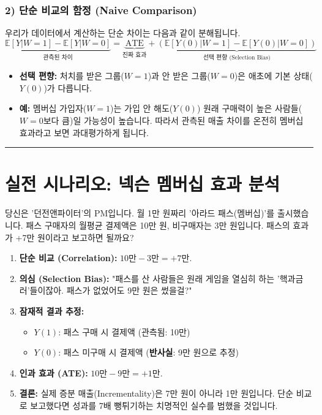 \documentclass[11pt,a4paper]{book}
\theoremstyle{definition}
\begin{document}
\subsubsection*{2) 단순 비교의 함정 (Naive Comparison)}
우리가 데이터에서 계산하는 단순 차이는 다음과 같이 분해됩니다.
$$ \underbrace{\mathbb{E}[Y|W=1] - \mathbb{E}[Y|W=0]}_{\text{관측된 차이}} = \underbrace{\text{ATE}}_{\text{진짜 효과}} + \underbrace{(\mathbb{E}[Y(0)|W=1] - \mathbb{E}[Y(0)|W=0])}_{\text{선택 편향 (Selection Bias)}} $$
\begin{itemize}
    \item \textbf{선택 편향:} 처치를 받은 그룹($W=1$)과 안 받은 그룹($W=0$)은 애초에 기본 상태($Y(0)$)가 다릅니다.
    \item \textbf{예:} 멤버십 가입자($W=1$)는 가입 안 해도($Y(0)$) 원래 구매력이 높은 사람들($W=0$보다 큼)일 가능성이 높습니다. 따라서 관측된 매출 차이를 온전히 멤버십 효과라고 보면 과대평가하게 됩니다.
\end{itemize}

\vspace{0.5cm}\hrule\vspace{0.5cm}

\section{실전 시나리오: 넥슨 멤버십 효과 분석}

\begin{storybox}[title={Scenario: 월정액 상품이 진짜 돈을 벌어줄까?}]
당신은 '던전앤파이터'의 PM입니다. 월 1만 원짜리 '아라드 패스(멤버십)'를 출시했습니다. 패스 구매자의 월평균 결제액은 10만 원, 비구매자는 3만 원입니다. 패스의 효과가 +7만 원이라고 보고하면 될까요?
\end{storybox}

\begin{enumerate}
    \item \textbf{단순 비교 (Correlation):} $10\text{만} - 3\text{만} = +7\text{만}$.
    \item \textbf{의심 (Selection Bias):} "패스를 산 사람들은 원래 게임을 열심히 하는 '핵과금러'들이잖아. 패스가 없었어도 9만 원은 썼을걸?"
    \item \textbf{잠재적 결과 추정:}
        \begin{itemize}
            \item $Y(1)$: 패스 구매 시 결제액 (관측됨: 10만)
            \item $Y(0)$: 패스 미구매 시 결제액 (\textbf{반사실}: 9만 원으로 추정)
        \end{itemize}
    \item \textbf{인과 효과 (ATE):} $10\text{만} - 9\text{만} = +1\text{만}$.
    \item \textbf{결론:} 실제 증분 매출(Incrementality)은 7만 원이 아니라 1만 원입니다. 단순 비교로 보고했다면 성과를 7배 뻥튀기하는 치명적인 실수를 범했을 것입니다.
\end{enumerate}
\end{document}
